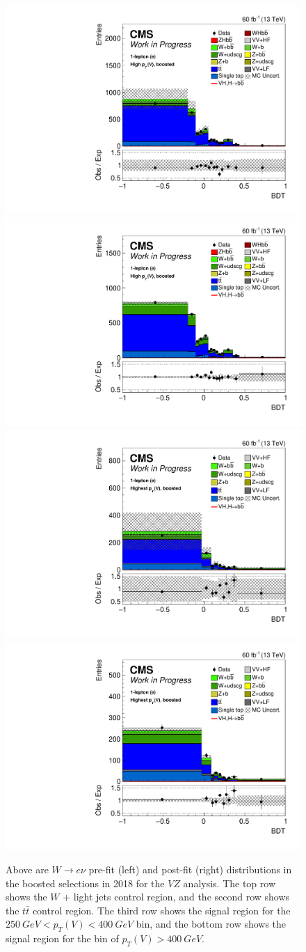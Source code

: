 \begin{figure}
  \includegraphics[width=0.35\linewidth]{figures/210323_STXS_VZ_unblinded_XbbVZ_8fe9e9cd_postfitplots/plot_shapes_vhbb_Wen_22_13TeV2018_prefit}
  \includegraphics[width=0.35\linewidth]{figures/210323_STXS_VZ_unblinded_XbbVZ_8fe9e9cd_postfitplots/plot_shapes_vhbb_Wen_22_13TeV2018_postfit} \\
  \includegraphics[width=0.35\linewidth]{figures/210323_STXS_VZ_unblinded_XbbVZ_8fe9e9cd_postfitplots/plot_shapes_vhbb_Wen_24_13TeV2018_prefit}
  \includegraphics[width=0.35\linewidth]{figures/210323_STXS_VZ_unblinded_XbbVZ_8fe9e9cd_postfitplots/plot_shapes_vhbb_Wen_24_13TeV2018_postfit} \\
  \caption[$W\rightarrow e\nu$ $V\!Z$ distributions for the boosted selection in 2018]{
    Above are $W\rightarrow e\nu$ pre-fit (left) and post-fit (right) distributions in the boosted selections in 2018
    for the $V\!Z$ analysis.
    The top row shows the $W$ + light jets control region,
    and the second row shows the  $t\bar{t}$ control region.
    The third row shows the signal region for the $\SI{250}{GeV} < p_T(V) < \SI{400}{GeV}$ bin,
    and the bottom row shows the signal region for the bin of $p_T(V) > \SI{400}{GeV}$.
  }
  \label{fig:vz-wen-boost-2018}
\end{figure}

